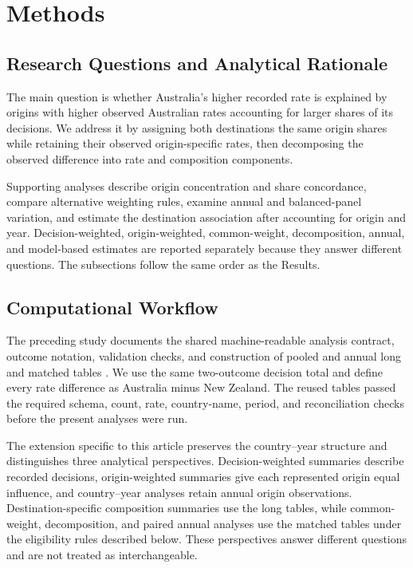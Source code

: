 \documentclass[runningheads]{llncs}
\begin{document}
\section{Methods}

\subsection{Research Questions and Analytical Rationale}

The main question is whether Australia's higher recorded rate is explained by origins with higher observed Australian rates accounting for larger shares of its decisions. We address it by assigning both destinations the same origin shares while retaining their observed origin-specific rates, then decomposing the observed difference into rate and composition components.

Supporting analyses describe origin concentration and share concordance, compare alternative weighting rules, examine annual and balanced-panel variation, and estimate the destination association after accounting for origin and year. Decision-weighted, origin-weighted, common-weight, decomposition, annual, and model-based estimates are reported separately because they answer different questions. The subsections follow the same order as the Results.

\subsection{Computational Workflow}

The preceding study documents the shared machine-readable analysis contract, outcome notation, validation checks, and construction of pooled and annual long and matched tables \cite{Kaplan2026AUNZDecisionOutcomes}. We use the same two-outcome decision total and define every rate difference as Australia minus New Zealand. The reused tables passed the required schema, count, rate, country-name, period, and reconciliation checks before the present analyses were run.

The extension specific to this article preserves the country--year structure and distinguishes three analytical perspectives. Decision-weighted summaries describe recorded decisions, origin-weighted summaries give each represented origin equal influence, and country--year analyses retain annual origin observations. Destination-specific composition summaries use the long tables, while common-weight, decomposition, and paired annual analyses use the matched tables under the eligibility rules described below. These perspectives answer different questions and are not treated as interchangeable.
\end{document}
